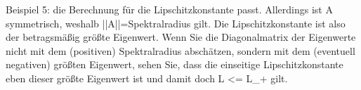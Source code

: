 Beispiel 5: die Berechnung für die Lipschitzkonstante passt. Allerdings ist A symmetrisch, weshalb ||A||=Spektralradius gilt. Die Lipschitzkonstante ist also der betragsmäßig größte Eigenwert. Wenn Sie die Diagonalmatrix der Eigenwerte nicht mit dem (positiven) Spektralradius abschätzen, sondern mit dem (eventuell negativen) größten Eigenwert, sehen Sie, dass die einseitige Lipschitzkonstante eben dieser größte Eigenwert ist und damit doch L <= L_+ gilt.
